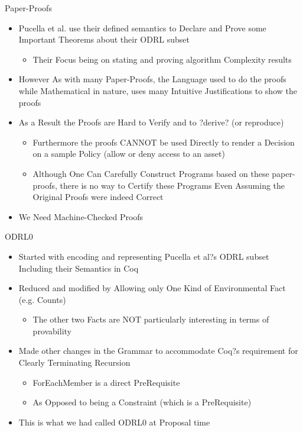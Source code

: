 \documentclass{beamer}
\begin{document}
\begin{frame}[fragile]{Paper-Proofs}
\begin{itemize}
\item Pucella et al. use their defined semantics to Declare and Prove some Important Theorems about their ODRL subset
\begin{itemize}
\item Their Focus being on stating and proving algorithm Complexity results
\end{itemize}
\item However As with many Paper-Proofs, the Language used to do the proofs while Mathematical in nature, uses many Intuitive Justifications to show the proofs
\item As a Result the Proofs are Hard to Verify and to ?derive? (or reproduce)
\begin{itemize}
\item Furthermore the proofs CANNOT be used Directly to render a Decision on a sample Policy (allow or deny access to an asset)
\item Although One Can Carefully Construct Programs based on these paper-proofs, there is no way to Certify these Programs Even Assuming the Original Proofs were indeed Correct
\end{itemize}
\item We Need Machine-Checked Proofs
\end{itemize}
\end{frame}
\begin{frame}[fragile]{ODRL0}
\begin{itemize}
\item Started with encoding and representing Pucella et al?s ODRL subset Including their Semantics in Coq
\item Reduced and modified by Allowing only One Kind of Environmental Fact (e.g. Counts)
   \begin{itemize}
      \item The other two Facts are NOT particularly interesting in terms of provability 
   \end{itemize}
\item Made other changes in the Grammar to accommodate Coq?s requirement for Clearly Terminating Recursion
    \begin{itemize}
        \item ForEachMember is a direct PreRequisite
        \item As Opposed to being a Constraint (which is a PreRequisite)
    \end{itemize}
\item This is what we had called ODRL0 at Proposal time
\end{itemize}
\end{frame}
\end{document}
